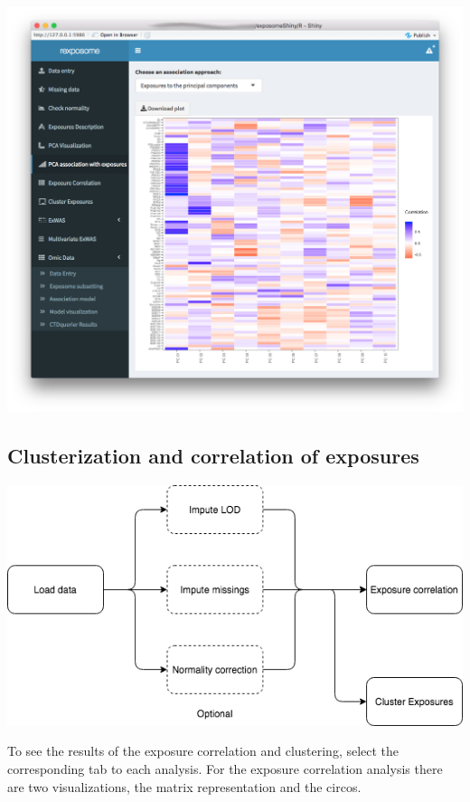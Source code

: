 \documentclass[
]{book}
\begin{document}
\includegraphics{images/analysis5_3.png}

\hypertarget{clusterization-and-correlation-of-exposures}{%
\subsection{Clusterization and correlation of exposures}\label{clusterization-and-correlation-of-exposures}}

\includegraphics{images/analysis6_1.png}

To see the results of the exposure correlation and clustering, select the corresponding tab to each analysis. For the exposure correlation analysis there are two visualizations, the matrix representation and the circos.
\end{document}
